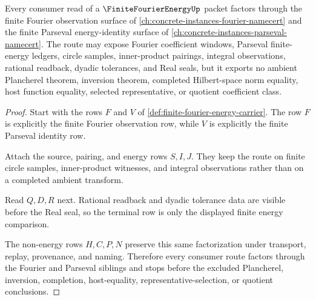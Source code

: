 \begin{theorem}
\label{thm:finite-fourier-energy-parseval-route}
Every consumer read of a $\FiniteFourierEnergyUp$ packet factors through the finite Fourier observation surface of \autoref{ch:concrete-instances-fourier-namecert} and the finite Parseval energy-identity surface of \autoref{ch:concrete-instances-parseval-namecert}. The route may expose Fourier coefficient windows, Parseval finite-energy ledgers, circle samples, inner-product pairings, integral observations, rational readback, dyadic tolerances, and Real seals, but it exports no ambient Plancherel theorem, inversion theorem, completed Hilbert-space norm equality, host function equality, selected representative, or quotient coefficient class.
\end{theorem}
\begin{proof}
Start with the rows $F$ and $V$ of \autoref{def:finite-fourier-energy-carrier}. The row $F$ is explicitly the finite Fourier observation row, while $V$ is explicitly the finite Parseval identity row.

Attach the source, pairing, and energy rows $S,I,J$. They keep the route on finite circle samples, inner-product witnesses, and integral observations rather than on a completed ambient transform.

Read $Q,D,R$ next. Rational readback and dyadic tolerance data are visible before the Real seal, so the terminal row is only the displayed finite energy comparison.

The non-energy rows $H,C,P,N$ preserve this same factorization under transport, replay, provenance, and naming. Therefore every consumer route factors through the Fourier and Parseval siblings and stops before the excluded Plancherel, inversion, completion, host-equality, representative-selection, or quotient conclusions.
\end{proof}



